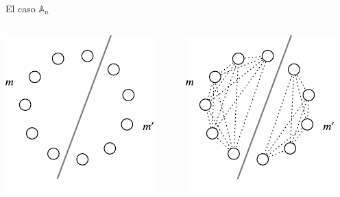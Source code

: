 \documentclass[spanish]{beamer}
\begin{document}
\begin{frame}{El caso $\mathbb{A}_n$}
  \begin{columns}
    \begin{column}{5cm}
      \includegraphics[height=1\textwidth]{Figuras/A-bloque2} 
    \end{column}
    \begin{column}{5cm}
      \includegraphics[height=1\textwidth]{Figuras/A-bloque3}      
    \end{column}
  \end{columns}
\end{frame}
\end{document}
